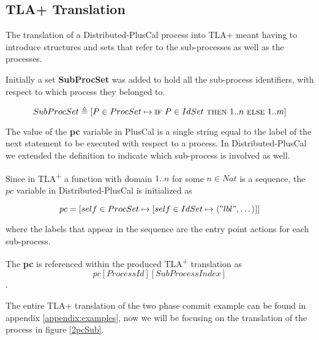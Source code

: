 \documentclass{thesul}
\newcommand{\tlaplus}{TLA\textsuperscript{+}\xspace}
\newcommand{\IF}{\textsc{if}}
\newcommand{\THEN}{\textsc{then}}
\newcommand{\ELSE}{\textsc{else}}
\newcommand{\seq}[1]{\langle #1 \rangle}
\begin{document}
\subsection{TLA+ Translation}

The translation of a Distributed-PlusCal process into TLA+ meant having to introduce structures and sets that refer to the sub-processes as well as the processes.

Initially a set \textbf{SubProcSet} was added to hold all the sub-process identifiers, with respect to which process they belonged to.

\[
SubProcSet \triangleq [P \in ProcSet \mapsto \IF\ P \in IdSet\ \THEN\  1..n\ 
								\ELSE\  1..m ]
\]						  

The value of the \textbf{pc} variable in PlusCal is a single string equal to the label of the next statement to be executed with respect to a process. In Distributed-PlusCal we extended the definition to indicate which sub-process is involved as well.

Since in \tlaplus a function with domain $1..n$ for some $n \in Nat$ is a sequence, the $pc$ variable in Distributed-PlusCal is initialized as

\[
pc = [self \in ProcSet \mapsto [self \in IdSet \mapsto \seq{"lbl",\dots}]]
\]	

where the labels that appear in the sequence are the entry point actions for each sub-process. 

The \textbf{pc} is referenced within the produced \tlaplus translation as \[ pc[Process Id][SubProcess Index] \].
		  
The entire TLA+ translation of the two phase commit example can be found in appendix \ref{appendix:examples}, now we will be focusing on the translation of the process in figure \ref{2pcSub}.
\end{document}
